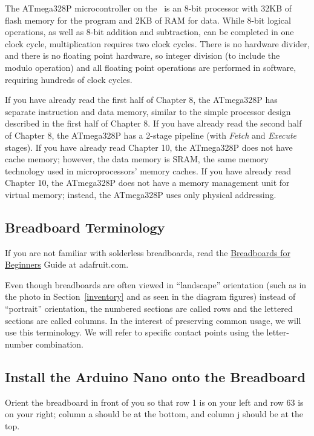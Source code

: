 The ATmega328P microcontroller on the \nano\ is an 8-bit processor with
32KB of flash memory for the program and 2KB of RAM for data. While 8-bit
logical operations, as well as 8-bit addition and subtraction, can be completed
in one clock cycle, multiplication requires two clock cycles. There is no
hardware divider, and there is no floating point hardware, so integer division
(to include the modulo operation) and all floating point operations are
performed in software, requiring hundreds of clock cycles.

If you have already read the first half of Chapter 8, the ATmega328P has
separate instruction and data memory, similar to the simple processor design
described in the first half of Chapter 8. If you have already read the second
half of Chapter 8, the ATmega328P has a 2-stage pipeline (with \textit{Fetch}
and \textit{Execute} stages). If you have already read Chapter 10, the
ATmega328P does not have cache memory; however, the data memory is SRAM, the
same memory technology used in microprocessors' memory caches. If you have
already read Chapter 10, the ATmega328P does not have a memory management unit
for virtual memory; instead, the ATmega328P uses only physical addressing.

\subsection{Breadboard Terminology}

If you are not familiar with solderless breadboards, read the
\href{https://learn.adafruit.com/breadboards-for-beginners?view=all}{Breadboards for Beginners}
Guide at adafruit.com.

Even though breadboards are often viewed in ``landscape'' orientation (such
as in the photo in Section~\ref{inventory} and as seen in the diagram figures)
instead of ``portrait'' orientation, the numbered sections are called rows and
the lettered sections are called columns. In the interest of preserving common
usage, we will use this terminology. We will refer to specific contact points
using the letter-number combination.

\subsection{Install the Arduino Nano onto the Breadboard}

Orient the breadboard in front of you so that row 1 is on your left and row 63
is on your right; column a should be at the bottom, and column j should be at
the top.

